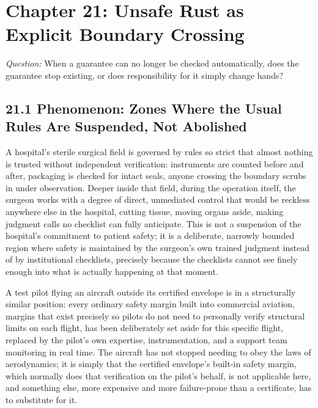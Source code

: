 \documentclass[11pt]{book}
\begin{document}
\clearpage

\chapter*{Chapter 21: Unsafe Rust as Explicit Boundary Crossing}

\begin{firstprinciples}
\textit{Question:} When a guarantee can no longer be checked automatically, does the guarantee stop existing, or does responsibility for it simply change hands?
\end{firstprinciples}

\section*{21.1 Phenomenon: Zones Where the Usual Rules Are Suspended, Not Abolished}

A hospital's sterile surgical field is governed by rules so strict that almost nothing is trusted without independent verification: instruments are counted before and after, packaging is checked for intact seals, anyone crossing the boundary scrubs in under observation. Deeper inside that field, during the operation itself, the surgeon works with a degree of direct, unmediated control that would be reckless anywhere else in the hospital, cutting tissue, moving organs aside, making judgment calls no checklist can fully anticipate. This is not a suspension of the hospital's commitment to patient safety; it is a deliberate, narrowly bounded region where safety is maintained by the surgeon's own trained judgment instead of by institutional checklists, precisely because the checklists cannot see finely enough into what is actually happening at that moment.

A test pilot flying an aircraft outside its certified envelope is in a structurally similar position: every ordinary safety margin built into commercial aviation, margins that exist precisely so pilots do not need to personally verify structural limits on each flight, has been deliberately set aside for this specific flight, replaced by the pilot's own expertise, instrumentation, and a support team monitoring in real time. The aircraft has not stopped needing to obey the laws of aerodynamics; it is simply that the certified envelope's built-in safety margin, which normally does that verification on the pilot's behalf, is not applicable here, and something else, more expensive and more failure-prone than a certificate, has to substitute for it.
\end{document}
